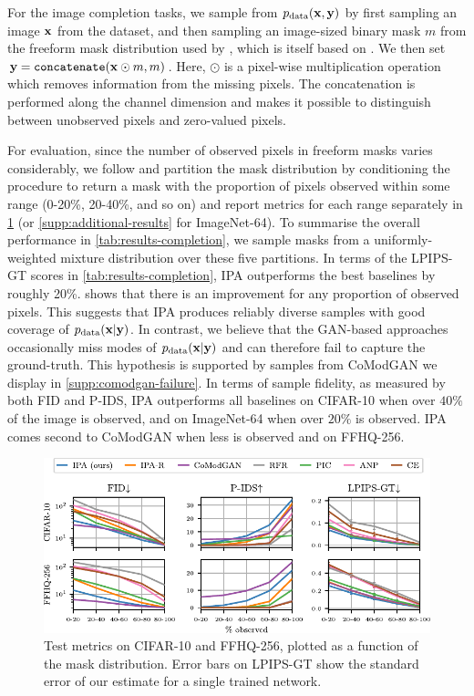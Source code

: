 For the image completion tasks, we sample from $p_{\rm{data}}{}(\mathbf{x}{}, \mathbf{y}{})$ by
first sampling an image $\mathbf{x}{}$ from the dataset, and then sampling an
image-sized binary mask $m$ from the freeform mask distribution used by
\citet{zhao2021large}, which is itself based on \citet{yu2018generative}. We
then set $\mathbf{y}{} = \texttt{concatenate}(\mathbf{x}{} \odot m, m)$. Here, $\odot$ is a
pixel-wise multiplication operation which removes information from the missing
pixels. The concatenation is performed along the channel dimension and makes it
possible to distinguish between unobserved pixels and zero-valued pixels.

For evaluation, since the number of observed pixels in freeform masks varies
considerably, we follow \citet{zhao2021large} and partition the mask
distribution by conditioning the procedure to return a mask with the proportion
of pixels observed within some range (0-20\%, 20-40\%, and so on) and report
metrics for each range separately in \cref{fig:metrics} (or
\cref{supp:additional-results} for ImageNet-64). To summarise the
overall performance in \cref{tab:results-completion}, we sample masks from a
uniformly-weighted mixture distribution over these five partitions. In terms of
the LPIPS-GT scores in \cref{tab:results-completion}, IPA outperforms the best
baselines by roughly 20\%.  shows that there is an improvement
for any proportion of observed pixels. This suggests that IPA produces reliably
diverse samples with good coverage of $p_{\rm{data}}{}(\mathbf{x}{}|\mathbf{y}{})$. In contrast, we
believe that the GAN-based approaches occasionally miss modes of
$p_{\rm{data}}{}(\mathbf{x}{}|\mathbf{y}{})$ and can therefore fail to capture the ground-truth.
This hypothesis is supported by samples from CoModGAN we display in
\cref{supp:comodgan-failure}. In terms of sample fidelity, as measured by both
FID and P-IDS, IPA outperforms all baselines on CIFAR-10 when over $40\%$ of the
image is observed, and on ImageNet-64 when over $20\%$ is observed. IPA comes
second to CoModGAN when less is observed and on FFHQ-256.

\begin{figure}[t]
  \centering
  \includegraphics[width=\textwidth]{figs/cigcvae/metrics}
  \caption{Test metrics on CIFAR-10 and FFHQ-256, plotted as a function of
    the mask distribution. Error bars on LPIPS-GT show the standard error of our
    estimate for a single trained network.}
  \label{fig:metrics}
  \vspace{-.5cm}
\end{figure}


